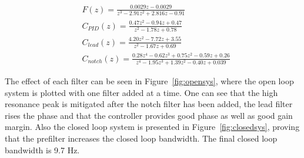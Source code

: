 \begin{subequations}
  \label{eq:controller}
\begin{alignat}{2}
  \label{eq:pre}
  & F(z) = \frac{0.0029z - 0.0029}{z^3 - 2.91z^2 + 2.816 z - 0.91} \\
  \label{eq:pid}
  & C_{PID}(z) = \frac{0.47z^2 - 0.94z + 0.47}{z^2 - 1.78 z + 0.78} \\
  \label{eq:lead}
  & C_{lead}(z) = \frac{4.20 z^2 - 7.72z + 3.55}{z^2 - 1.67z + 0.69} \\
  \label{eq:notch}
  & C_{notch}(z) = \frac{0.28z^4 - 0.62z^3 + 0.75z^2 - 0.59z + 0.26}{z^4 - 1.95z^3 + 1.39z^2 - 0.40z + 0.039}
\end{alignat}
\end{subequations}

The effect of each filter can be seen in Figure~\ref{fig:opensys}, where the open loop system is plotted with one filter added at a time. One can see that the high resonance peak is mitigated after the notch filter has been added, the lead filter rises the phase and that the \abbrPID controller provides good phase as well as good gain margin. Also the closed loop system is presented in Figure~\ref{fig:closedsys}, proving that the prefilter increases the closed loop bandwidth. The final closed loop bandwidth is 9.7 Hz.


